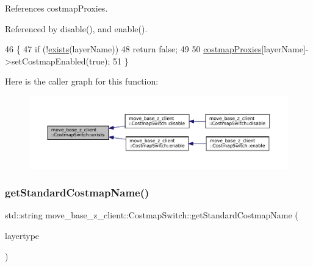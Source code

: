 References costmap\+Proxies.



Referenced by disable(), and enable().


\begin{DoxyCode}
46 \{
47     \textcolor{keywordflow}{if} (!\hyperlink{classmove__base__z__client_1_1CostmapSwitch_a3898ad9aa2ecf59d29a99e152f21a0d4}{exists}(layerName))
48         \textcolor{keywordflow}{return} \textcolor{keyword}{false};
49 
50     \hyperlink{classmove__base__z__client_1_1CostmapSwitch_ab9b33bc5774b41e5898718ffdcfcbc25}{costmapProxies}[layerName]->setCostmapEnabled(\textcolor{keyword}{true});
51 \}
\end{DoxyCode}
Here is the caller graph for this function\+:
\nopagebreak
\begin{figure}[H]
\begin{center}
\leavevmode
\includegraphics[width=350pt]{classmove__base__z__client_1_1CostmapSwitch_a3898ad9aa2ecf59d29a99e152f21a0d4_icgraph}
\end{center}
\end{figure}
\mbox{\label{classmove__base__z__client_1_1CostmapSwitch_ae8635d58b81be774e18eb4afa99413e1}} 
\subsubsection{\texorpdfstring{get\+Standard\+Costmap\+Name()}{getStandardCostmapName()}}
{\footnotesize\ttfamily std\+::string move\+\_\+base\+\_\+z\+\_\+client\+::\+Costmap\+Switch\+::get\+Standard\+Costmap\+Name (\begin{DoxyParamCaption}\item[{\hyperlink{classmove__base__z__client_1_1CostmapSwitch_a810338d2ba3fe25fc4ecf8c6c85b462b}{Standard\+Layers}}]{layertype }\end{DoxyParamCaption})\hspace{0.3cm}{\ttfamily [static]}}



